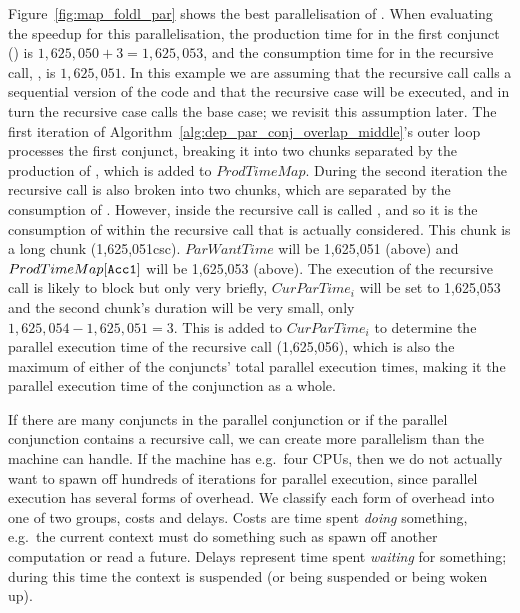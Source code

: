 Figure~\ref{fig:map_foldl_par} shows the best parallelisation of
\mapfoldl.
When evaluating the speedup for this parallelisation,
the production time for  in the first conjunct
()
is
$1,625,050 + 3 = 1,625,053$, and
the consumption time for  in the recursive call,
,
is $1,625,051$.
In this example we are assuming that the recursive call calls a sequential
version of the code and that the recursive case will be executed,
and in turn the recursive case calls the base case;
we revisit this assumption later.
The first iteration of
Algorithm~\ref{alg:dep_par_conj_overlap_middle}'s outer loop processes the
first conjunct,
breaking it into two chunks separated by the production of ,
which is added to $ProdTimeMap$.
During the second iteration the recursive call is also broken into two
chunks, which are separated by the consumption of .
However, inside the recursive call  is called ,
and so it is the consumption of  within the recursive call that
is actually considered.
This chunk is a long chunk (1,625,051csc).
$ParWantTime$ will be 1,625,051 (above) and $ProdTimeMap[\text{{\tt Acc1}}]$
will be 1,625,053 (above).
The execution of the recursive call is likely to block
but only very briefly,
$CurParTime_i$ will be set to 1,625,053 and the second chunk's duration will
be very small, only $1,625,054 - 1,625,051 = 3$.
This is added to $CurParTime_i$ to determine the parallel execution time of
the recursive call (1,625,056),
which is also the maximum of either of the conjuncts' total parallel
execution times,
making it the parallel execution time of the conjunction as a whole.

If there are many conjuncts in the parallel conjunction or if the parallel
conjunction contains a recursive call,
we can create more parallelism than the machine can handle.
If the machine has e.g.\ four CPUs,
then we do not actually want to spawn off
hundreds of iterations for parallel execution,
since parallel execution has several forms of overhead.
We classify each form of overhead into one of two groups, costs and delays.
Costs are time spent \emph{doing} something,
e.g.\ the current context must do something such as spawn off another
computation or read a future.
Delays represent time spent \emph{waiting} for something;
during this time the context is suspended (or being suspended or being woken
up).

